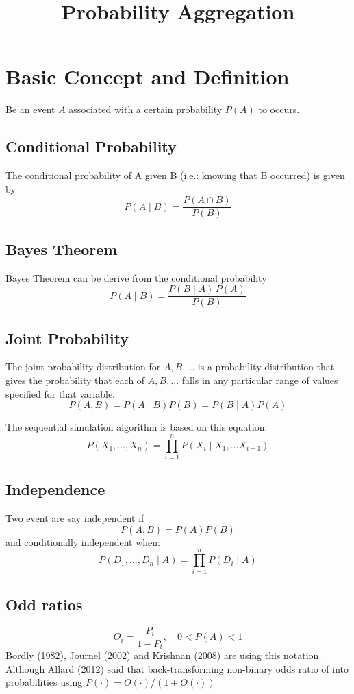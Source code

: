 \documentclass[twocolumn]{article}
\title{Probability Aggregation}
\date{\vspace{-6ex}}
\numberwithin{equation}{section}
\begin{document}
\maketitle


\section{Basic Concept and Definition}
Be an event $A$ associated with a certain probability $P(A)$ to occurs.

	\subsection{Conditional Probability}
The conditional probability of A given B (i.e.: knowing that B occurred) is given by 
$$P(A \mid B)= \frac{P(A \cap B)}{P(B)}$$

	\subsection{Bayes Theorem}
Bayes Theorem can be derive from the conditional probability 
$$P(A \mid B) = \frac{P(B \mid  A)\, P(A)}{P(B)} $$

	\subsection{Joint Probability}
The joint probability distribution for $A,B,\ldots$ is a probability distribution that gives the probability that each of $A,B,\ldots$ falls in any particular range of values specified for that variable.
$$P(A,B)=P(A \mid B) P(B)=P(B \mid A) P(A)$$

The sequential simulation algorithm is based on this equation:
$$P(X_1,\ldots,X_n) = \prod_{i=1}^n  P(X_i \mid X_1, \ldots X_{i-1}) $$

	\subsection{Independence}

Two event are say independent if 
$$P(A,B) = P(A)P(B)$$
and conditionally independent when:
$$P(D_1,\ldots,D_n \mid A) = \prod_{i=1}^n P(D_i\mid A)$$

	\subsection{Odd ratios}
$$O_i = \frac{P_i}{1-P_i}, \quad 0<P(A)<1$$
Bordly (1982), Journel (2002) and Krishnan (2008) are using this notation. Although Allard (2012) said that back-transforming non-binary odds ratio of into probabilities using $P(\cdot)=O(\cdot)/(1+O(\cdot))$
\end{document}
